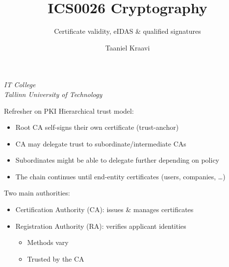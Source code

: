 

\usepackage[dvipsnames]{xcolor}

\usepackage{booktabs}

\usepackage{fancyvrb}

\usepackage{csquotes}

\usepackage{graphicx}
\graphicspath{ {../../images/} }

\usepackage{pgfplots}
\usetikzlibrary{positioning,calc,external}

\usepackage{crysymb}

\renewcommand*{\arraystretch}{1.2}

\usepackage{soul}
\usepackage[en-GB]{datetime2}

\usetikzlibrary{positioning,calc}
\graphicspath{ {../../images/} }

\title{ICS0026 Cryptography}
\subtitle{Certificate validity, eIDAS \& qualified signatures}
\date{}
\author{Taaniel Kraavi}
\institute%
{%
    \textit{IT College}\\
    \textit{Tallinn University of Technology}
}


\begin{frame}
  \titlepage
\end{frame}

\begin{frame}{Refresher on PKI}
  Hierarchical trust model:
  \begin{itemize}[<+(1)->]
    \item Root CA self-signs their own certificate (trust-anchor)
    \item CA may delegate trust to subordinate/intermediate CAs
    \item Subordinates might be able to delegate further depending on policy
    \item The chain continues until end-entity certificates (users, companies, \dots)
  \end{itemize}

  \vspace*{1em}

  \pause
  Two main authorities:
  \begin{itemize}[<+(1)->]
    \item Certification Authority (CA): issues \& manages certificates
    \item Registration Authority (RA): verifies applicant identities
    \begin{itemize}
      \item Methods vary
      \item Trusted by the CA
    \end{itemize}
  \end{itemize}
\end{frame}

